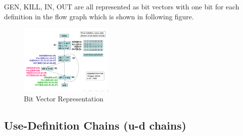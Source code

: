 \documentclass{article}
\begin{document}
GEN, KILL, IN, OUT are all represented as bit vectors with one bit for each definition in the flow graph which is shown in following figure. \\

\begin{figure}[h]
    \centering
    \includegraphics[width=0.4\textwidth]{Images/bitVector.png}
    \caption{Bit Vector Representation}
    \label{fig:BitVector}
\end{figure}

\subsection*{Use-Definition Chains (u-d chains)}
\end{document}
